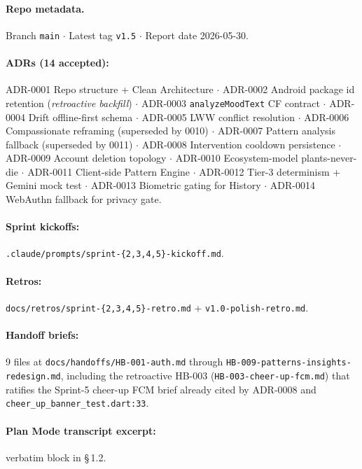 \documentclass[11pt,a4paper]{article}
\begin{document}
\paragraph{Repo metadata.} Branch \texttt{main} $\cdot$ Latest tag \texttt{v1.5} $\cdot$
Report date 2026-05-30.

\paragraph{ADRs (14 accepted):} ADR-0001 Repo structure + Clean
Architecture $\cdot$ ADR-0002 Android package id retention (\emph{retroactive
backfill}) $\cdot$ ADR-0003 \texttt{analyzeMoodText} CF contract $\cdot$
ADR-0004 Drift offline-first schema $\cdot$ ADR-0005 LWW conflict
resolution $\cdot$ ADR-0006 Compassionate reframing (superseded by 0010)
$\cdot$ ADR-0007 Pattern analysis fallback (superseded by 0011) $\cdot$
ADR-0008 Intervention cooldown persistence $\cdot$ ADR-0009 Account
deletion topology $\cdot$ ADR-0010 Ecosystem-model plants-never-die
$\cdot$ ADR-0011 Client-side Pattern Engine $\cdot$ ADR-0012 Tier-3
determinism + Gemini mock test $\cdot$ ADR-0013 Biometric gating for
History $\cdot$ ADR-0014 WebAuthn fallback for privacy gate.

\paragraph{Sprint kickoffs:}
\texttt{.claude/prompts/sprint-\{2,3,4,5\}-kickoff.md}.

\paragraph{Retros:}
\texttt{docs/retros/sprint-\{2,3,4,5\}-retro.md} +
\texttt{v1.0-polish-retro.md}.

\paragraph{Handoff briefs:} 9 files at
\texttt{docs/handoffs/HB-001-auth.md} through
\texttt{HB-009-patterns-insights-redesign.md}, including the
retroactive HB-003 (\texttt{HB-003-cheer-up-fcm.md}) that ratifies the
Sprint-5 cheer-up FCM brief already cited by ADR-0008 and
\texttt{cheer\_up\_banner\_test.dart:33}.

\paragraph{Plan Mode transcript excerpt:} verbatim block in \S\,1.2.
\end{document}
